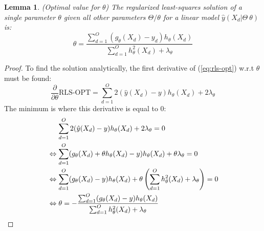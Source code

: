 \documentclass[10pt]{journal}
\newtheorem{lemma}{Lemma}
\newtheorem{proof}{Proof}
\begin{document}
\begin{lemma}
    (Optimal value for $\theta$) The regularized least-squares solution of a
    single parameter $\theta$ given all other parameters $\Theta / {\theta}$ for
    a linear model $\hat{y}(X_d| \Theta \ {\theta})$ is:
    \begin{equation}
        \theta = \frac{ \sum_{d=1}^{O} (g_\theta(X_d) - y_d) h_\theta(X_d) }
                      { \sum_{d=1}^{O} h^2_\theta(X_d) + \lambda_\theta }
    \end{equation}
\end{lemma}

\begin{proof}
    To find the solution analytically, the first derivative of
    (\ref{eq:rls-opt}) w.r.t $\theta$ must be found:
    \begin{equation} \label{eq:rls-opt-derivative}
        \frac{ \partial }{ \partial\theta } \text{RLS-OPT} =
            \sum_{d=1}^{O} 2(\hat{y}(X_d) - y) h_\theta(X_d) + 2\lambda_\theta
    \end{equation}
    The minimum is where this derivative is equal to 0:
    \begin{align}
        & \hphantom{==} \begin{aligned}[t]
            \sum_{d=1}^{O} 2(\hat{y}(X_d) - y) h_\theta(X_d) +
                2\lambda_\theta = 0
        \end{aligned} \\
        & \Leftrightarrow \begin{aligned}[t]
            \sum_{d=1}^{O}
                (g_\theta(X_d) + \theta h_\theta(X_d) - y) h_\theta(X_d) +
            \theta\lambda_\theta = 0
        \end{aligned} \\
        & \Leftrightarrow \begin{aligned}[t]
            \sum_{d=1}^{O}
                (g_\theta(X_d) - y) h_\theta(X_d) +
            \theta\left(
                \sum_{d=1}^{O} h^2_\theta(X_d) + \lambda_\theta
            \right) = 0
        \end{aligned} \\
        & \Leftrightarrow \begin{aligned}[t]
            \theta = -\frac{\sum_{d=1}^{O} (g_\theta(X_d) - y) h_\theta(X_d)}
                           {\sum_{d=1}^{O} h^2_\theta(X_d) + \lambda_\theta}
        \end{aligned}
    \end{align}
\end{proof}
\end{document}
